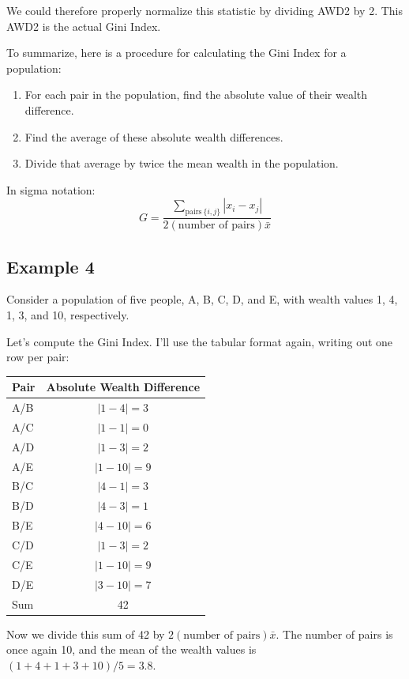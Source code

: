 \documentclass[12pt]{memoir}\usepackage[]{graphicx}\usepackage[table]{xcolor}
\begin{document}
We could therefore properly normalize this statistic by dividing AWD2 by 2. 
This AWD2 is the actual Gini Index.

To summarize, here is a procedure for calculating the Gini Index for a population:

\begin{enumerate}
\item For each pair in the population, find the absolute value of their
wealth difference.
\item Find the average of these absolute wealth differences.
\item Divide that average by twice the mean wealth in the population.
\end{enumerate}

In sigma notation: 
$$G = \dfrac{\displaystyle\sum_{\text{pairs}\ \{i, j\}} |x_i - x_j|}{2(\text{number of pairs})\bar{x}}$$

\subsection*{Example 4}
Consider a population of five people, A, B, C, D, and E, with
wealth values 1, 4, 1, 3, and 10, respectively.  

Let's compute the Gini Index.  I'll use the tabular format again, writing
out one row per pair: 

\begin{center}
\begin{tabular}{lc}
\toprule
Pair & Absolute Wealth Difference \\ \midrule
A/B & $|1 - 4| = 3$  \\ \midrule
A/C & $|1 - 1| = 0$  \\ \midrule
A/D & $|1 - 3| = 2$ \\ \midrule
A/E & $|1 - 10| = 9$ \\ \midrule
B/C & $|4 - 1| = 3$ \\ \midrule
B/D & $|4 - 3| = 1$ \\ \midrule
B/E & $|4 - 10| = 6$ \\ \midrule
C/D & $|1 - 3| = 2$ \\ \midrule
C/E & $|1 - 10| = 9$ \\ \midrule
D/E & $|3 - 10| = 7$ \\ \bottomrule
Sum & 42
\end{tabular}
\end{center}

Now we divide this sum of 42 by $2(\text{number of pairs})\bar{x}$.  The 
number of pairs is once again 10, and the mean of the wealth values is 
$(1 + 4 + 1 + 3 + 10)/5 = 3.8$. 
\end{document}
